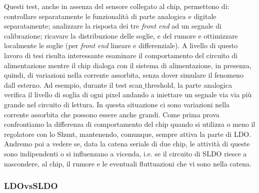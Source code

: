Questi test, anche in assenza del sensore collegato al chip, permettono di: controllare separatamente le funzionalità di parte analogica e digitale separatamente; analizzare la risposta dei tre \textit{front end} ad un segnale di calibrazione; ricavare la distribuzione delle soglie, e del rumore e ottimizzare localmente le soglie (per \textit{front end} lineare e differenziale). 
A livello di questo lavoro di tesi risulta interessante esaminare il comportamento del circuito di alimentazione mentre il chip dialoga con il sistema di alimentazione, in presenza, quindi, di variazioni nella corrente assorbita, senza dover simulare il fenomeno dall esterno. 
Ad esempio, durante il test scan$\_$threshold, la parte analogica verifica il livello di soglia di ogni pixel andando a iniettare un segnale via via più grande nel circuito di lettura.
In questa situazione ci sono variazioni nella corrente assorbita che possono essere anche grandi. 
Come prima prova confrontiamo la differenza di comportamento del chip quando si utilizza o meno il regolatore con lo Shunt, mantenendo, comunque, sempre attiva la parte di LDO.
Andremo poi a vedere se, data la catena seriale di due chip, le attività di queste sono indipendenti o si influenzano a vicenda, i.e. se il circuito di SLDO riesce a nascondere, al chip, il rumore e le eventuali fluttuazioni che vi sono nella catena.

\subsubsection{LDOvsSLDO}

